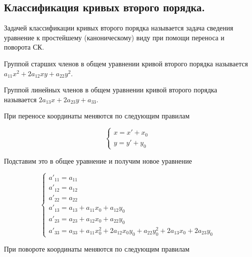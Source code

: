 \subsection{%
  Классификация кривых второго порядка.%
}

\begin{definition}
  Задачей классификации кривых второго порядка называется задача сведения
  уравнение к простейшему (каноническому) виду при помощи переноса и поворота
  СК.
\end{definition}

\begin{definition}
  Группой старших членов в общем уравнении кривой второго порядка называется
  \(a_{11} x^2 + 2 a_{12} xy + a_{22} y^2\).
\end{definition}

\begin{definition}
  Группой линейных членов в общем уравнении кривой второго порядка называется
  \(2 a_{13} x + 2 a_{23} y + a_{33}\).
\end{definition}


При переносе координаты меняются по следующим правилам

\begin{equation*}
  \begin{cases}
    x = x' + x_0 \\
    y = y' + y_0
  \end{cases}
\end{equation*}

Подставим это в общее уравнение и получим новое уравнение

\begin{equation*}
  \begin{cases}
    a'_{11} = a_{11} \\
    a'_{12} = a_{12} \\
    a'_{22} = a_{22} \\
    a'_{13} = a_{13} + a_{11} x_0 + a_{12} y_0 \\
    a'_{23} = a_{23} + a_{12} x_0 + a_{22} y_0 \\
    a'_{33} = a_{33} + a_{11} x_0^2 + 2 a_{12} x_0 y_0
      + a_{22} y_0^2 + 2 a_{13} x_0 + 2 a_{23} y_0
  \end{cases}
\end{equation*}


При повороте координаты меняются по следующим правилам

